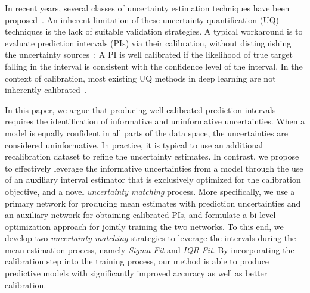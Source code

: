 \documentclass[letterpaper]{article} %
\begin{document}
In recent years, several classes of uncertainty estimation techniques have been proposed~\cite{gal2016dropout,gal2017concrete,lakshminarayanan2017ensemble,ghahramani2015probabilistic}.
An inherent limitation of these uncertainty quantification (UQ) techniques is the lack of suitable validation strategies. A typical workaround is to evaluate prediction intervals (PIs) via their calibration, without distinguishing the uncertainty sources~\cite{heskes1997practical}: A PI is well calibrated if the likelihood of true target falling in the interval is consistent with the confidence level of the interval. In the context of calibration, most existing UQ methods in deep learning are not inherently calibrated~\cite{kuleshov2018accurate}.

In this paper, we argue that producing well-calibrated prediction intervals requires the identification of informative and uninformative uncertainties. When a model is equally confident in all parts of the data space, the uncertainties are considered uninformative. In practice, it is typical to use an additional recalibration dataset to refine the uncertainty estimates. In contrast, we propose to effectively leverage the informative uncertainties from a model through the use of an auxiliary interval estimator that is exclusively optimized for the calibration objective, and a novel \textit{uncertainty matching} process. More specifically, we use a primary network for producing mean estimates with prediction uncertainties and an auxiliary network for obtaining calibrated PIs, and formulate a bi-level optimization approach for jointly training the two networks. To this end, we develop two \textit{uncertainty matching} strategies to leverage the intervals during the mean estimation process, namely \textit{Sigma Fit} and \textit{IQR Fit}. By incorporating the calibration step into the training process, our method is able to produce predictive models with significantly improved accuracy as well as better calibration.
\end{document}
